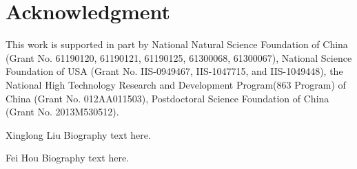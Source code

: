 \documentclass[journal]{IEEEtran}
\begin{document}
\section*{Acknowledgment}
This work is supported in part by National Natural Science Foundation of China (Grant No. 61190120, 61190121, 61190125, 61300068, 61300067), National Science Foundation of USA (Grant No. IIS-0949467, IIS-1047715, and IIS-1049448), the National High Technology Research and Development Program(863 Program) of China (Grant No. 012AA011503), Postdoctoral Science Foundation of China (Grant No. 2013M530512).


\ifCLASSOPTIONcaptionsoff
  \newpage
\fi








%

\begin{IEEEbiography}{Xinglong Liu}
Biography text here.
\end{IEEEbiography}

\begin{IEEEbiographynophoto}{Fei Hou}
Biography text here.
\end{IEEEbiographynophoto}
\end{document}
